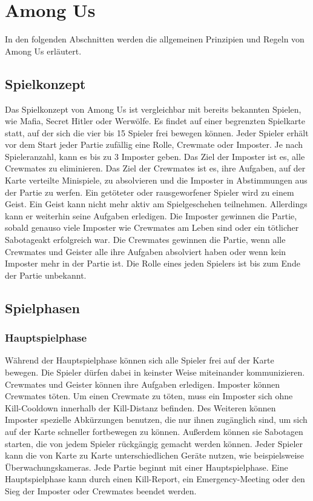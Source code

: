 \section{Among Us}
In den folgenden Abschnitten werden die allgemeinen Prinzipien und Regeln von
Among Us erläutert.
\subsection{Spielkonzept}
Das Spielkonzept von Among Us ist vergleichbar mit bereits bekannten Spielen,
wie Mafia, Secret Hitler oder Werwölfe.
\newline
Es findet auf einer begrenzten
Spielkarte statt, auf der sich die vier bis 15 Spieler frei bewegen können.
Jeder Spieler erhält vor dem Start jeder Partie zufällig eine Rolle, Crewmate
oder Imposter. Je nach Spieleranzahl, kann es bis zu 3 Imposter geben.
Das Ziel der Imposter ist es, alle Crewmates zu eliminieren.
Das Ziel der Crewmates ist es, ihre Aufgaben, auf der Karte verteilte
Minispiele, zu absolvieren und die Imposter in Abstimmungen aus der Partie zu
werfen.
Ein getöteter oder rausgeworfener Spieler wird zu einem Geist.
Ein Geist kann nicht mehr aktiv am Spielgeschehen teilnehmen. Allerdings kann er
weiterhin seine Aufgaben erledigen.
\newline
Die Imposter gewinnen die Partie, sobald genauso viele Imposter wie Crewmates
am Leben sind oder ein tötlicher Sabotageakt erfolgreich war. Die Crewmates
gewinnen die Partie, wenn alle Crewmates und Geister alle ihre Aufgaben
absolviert haben oder
wenn kein Imposter mehr in der Partie ist. Die Rolle eines jeden Spielers ist
bis zum Ende der Partie unbekannt.

\subsection{Spielphasen}
\subsubsection{Hauptspielphase}
Während der Hauptspielphase können sich alle Spieler frei auf der Karte bewegen.
Die Spieler dürfen dabei in keinster Weise miteinander kommunizieren.
Crewmates und Geister können ihre Aufgaben erledigen. Imposter können Crewmates
töten. Um einen Crewmate zu töten, muss ein Imposter sich ohne Kill-Cooldown
innerhalb der Kill-Distanz befinden.
Des Weiteren können Imposter spezielle Abkürzungen benutzen, die nur
ihnen zugänglich sind, um sich auf der Karte schneller fortbewegen zu können.
Außerdem können sie Sabotagen starten, die von jedem Spieler rückgängig
gemacht werden können. Jeder Spieler kann die von Karte zu Karte
unterschiedlichen Geräte nutzen, wie beispielsweise Überwachungskameras.
\newline
Jede Partie beginnt mit einer Hauptspielphase. Eine Hauptspielphase kann durch
einen Kill-Report, ein Emergency-Meeting oder den Sieg der Imposter oder
Crewmates beendet werden.

